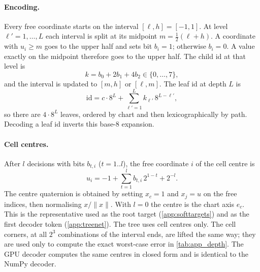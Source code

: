 \paragraph{Encoding.}
Every free coordinate starts on the interval $[\ell,h]=[-1,1]$. At level $\ell'=1,\dots,L$ each interval is split at its midpoint $m=\tfrac12(\ell+h)$. A coordinate with $u_i\ge m$ goes to the upper half and sets bit $b_i=1$; otherwise $b_i=0$. A value exactly on the midpoint therefore goes to the upper half. The child id at that level is
\begin{equation}
  k=b_0+2b_1+4b_2\in\{0,\dots,7\},
\end{equation}
and the interval is updated to $[m,h]$ or $[\ell,m]$. The leaf id at depth $L$ is
\begin{equation}
  \mathrm{id}=c\cdot 8^L+\sum_{\ell'=1}^{L}k_{\ell'}\,8^{L-\ell'},
\end{equation}
so there are $4\cdot8^L$ leaves, ordered by chart and then lexicographically by path. Decoding a leaf id inverts this base-8 expansion.

\paragraph{Cell centres.}
After $l$ decisions with bits $b_{t,i}$ ($t=1..l$), the free coordinate $i$ of the cell centre is
\begin{equation}
  u_i=-1+\sum_{t=1}^{l}b_{t,i}\,2^{1-t}+2^{-l}.
\end{equation}
The centre quaternion is obtained by setting $x_c=1$ and $x_{j}=u$ on the free indices, then normalising $x/\|x\|$. With $l=0$ the centre is the chart axis $e_c$. This is the representative used as the root target (\cref{app:softtargets}) and as the first decoder token (\cref{app:treenet}). The tree uses cell centres only. The cell corners, at all $2^3$ combinations of the interval ends, are lifted the same way; they are used only to compute the exact worst-case error in \cref{tab:app_depth}. The GPU decoder computes the same centres in closed form and is identical to the NumPy decoder.

